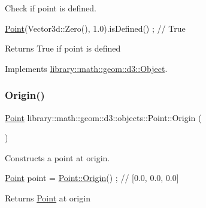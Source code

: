 Check if point is defined. 


\begin{DoxyCode}
\hyperlink{classlibrary_1_1math_1_1geom_1_1d3_1_1objects_1_1_point_a617e690ab6091af3de729cee337e309e}{Point}(Vector3d::Zero(), 1.0).isDefined() ; \textcolor{comment}{// True}
\end{DoxyCode}


\begin{DoxyReturn}{Returns}
True if point is defined 
\end{DoxyReturn}


Implements \hyperlink{classlibrary_1_1math_1_1geom_1_1d3_1_1_object_a2216442e322f0c3ca5f01a4efa22baf7}{library\+::math\+::geom\+::d3\+::\+Object}.

\mbox{\label{classlibrary_1_1math_1_1geom_1_1d3_1_1objects_1_1_point_ab2a38e285c562e50bf350272c083986f}} 
\subsubsection{\texorpdfstring{Origin()}{Origin()}}
{\footnotesize\ttfamily \hyperlink{classlibrary_1_1math_1_1geom_1_1d3_1_1objects_1_1_point}{Point} library\+::math\+::geom\+::d3\+::objects\+::\+Point\+::\+Origin (\begin{DoxyParamCaption}{ }\end{DoxyParamCaption})\hspace{0.3cm}{\ttfamily [static]}}



Constructs a point at origin. 


\begin{DoxyCode}
\hyperlink{classlibrary_1_1math_1_1geom_1_1d3_1_1objects_1_1_point_a617e690ab6091af3de729cee337e309e}{Point} point = \hyperlink{classlibrary_1_1math_1_1geom_1_1d3_1_1objects_1_1_point_ab2a38e285c562e50bf350272c083986f}{Point::Origin}() ; \textcolor{comment}{// [0.0, 0.0, 0.0]}
\end{DoxyCode}


\begin{DoxyReturn}{Returns}
\hyperlink{classlibrary_1_1math_1_1geom_1_1d3_1_1objects_1_1_point}{Point} at origin 
\end{DoxyReturn}
\mbox{\label{classlibrary_1_1math_1_1geom_1_1d3_1_1objects_1_1_point_a7c4c9c71f9b29b85925d8a7ed4943501}} 
